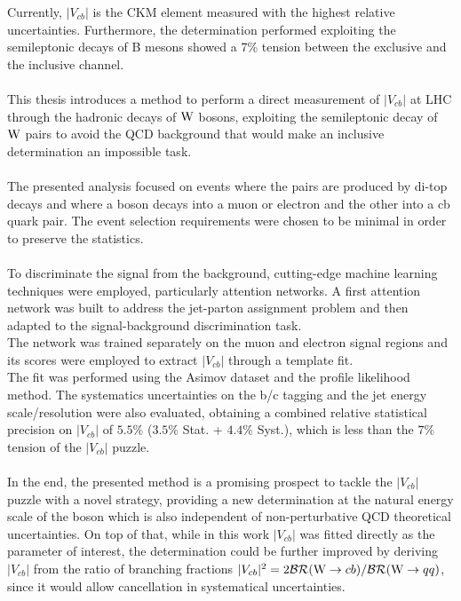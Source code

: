 \label{sec:END}
\vspace{-1cm}
Currently, $|V_{cb}|$ is the CKM element measured with the highest relative uncertainties. Furthermore, the determination performed exploiting the semileptonic decays of B mesons showed a 7\% tension between the exclusive and the inclusive channel.\\
\\
This thesis introduces a method to perform a direct measurement of $|V_{cb}|$ at LHC through the hadronic decays of ${\text{W}}$ bosons, exploiting the semileptonic decay of ${\text{W}}$ pairs to avoid the QCD background that would make an inclusive determination an impossible task.
\\
\\
The presented analysis focused on events where the \PW pairs are produced by di-top decays and where a \PW boson decays into a muon or electron and the other into a cb quark pair.
The event selection requirements were chosen to be minimal in order to preserve the statistics.\\
\\
To discriminate the signal from the background, cutting-edge machine learning techniques were employed, particularly attention networks. 
A first attention network was built to address the jet-parton assignment problem and then adapted to the signal-background discrimination task.\\
The network was trained separately on the muon and electron signal regions and its scores were employed to extract $|V_{cb}|$ through a template fit.\\
The fit was performed using the Asimov dataset and the profile likelihood method.
The systematics uncertainties on the b/c tagging and the jet energy scale/resolution were also evaluated, obtaining a combined relative statistical precision on $|V_{cb}|$ of $5.5\%$ ($3.5\%$ Stat. + $4.4\%$ Syst.), which is less than the $7\%$ tension of the $|V_{cb}|$ puzzle.
\\
\\
In the end, the presented method is a promising prospect to tackle the $|V_{cb}|$ puzzle with a novel strategy, providing a new determination at the natural energy scale of the \PW boson which is also independent of non-perturbative QCD theoretical uncertainties.
On top of that, while in this work $|V_{cb}|$ was fitted directly as the parameter of interest, the determination could be further improved by deriving $|V_{cb}|$ from the ratio of branching fractions $|V_{cb}|^2=2\mathcal{BR}({\text{W}} \to cb)/\mathcal{BR}({\text{W}} \to qq)$, since it would allow cancellation in systematical uncertainties.